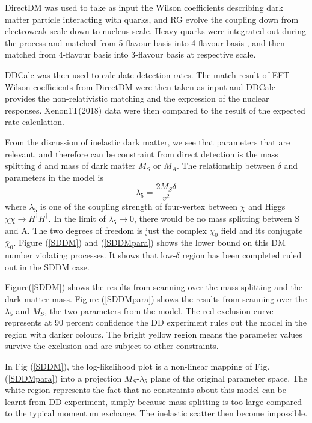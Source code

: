\documentclass[12pt]{article}
\begin{document}
DirectDM was used to take as input the Wilson coefficients describing dark matter particle interacting with quarks, and RG evolve the coupling down from electroweak scale down to nucleus scale. Heavy quarks were integrated out during the process and matched from 5-flavour basis into 4-flavour basis , and then matched from 4-flavour basis into 3-flavour basis at respective scale. 

DDCalc was then used to calculate detection rates. The match result of EFT Wilson coefficients from DirectDM were then taken as input and DDCalc provides the non-relativistic matching and the expression of the nuclear responses. Xenon1T(2018) data were then compared to the result of the expected rate calculation. 


From the discussion of inelastic dark matter, we see that parameters that are relevant, and therefore can be constraint from direct detection is the mass splitting $\delta$ and mass of dark matter $M_S$ or $M_A$. The relationship between $\delta$ and parameters in the model is
$$
\lambda_5 = \frac{2M_S \delta }{v^2}
$$
where $\lambda_5$ is one of the coupling strength of four-vertex between $\chi$ and Higgs $\chi\chi \rightarrow H^\dagger H^\dagger$. In the limit of $\lambda_5 \rightarrow 0$, there would be no mass splitting between S and A. The two degrees of freedom is just the complex $\chi_0$ field and its conjugate $\bar \chi_0$. Figure (\ref{SDDM}) and (\ref{SDDMpara}) shows the lower bound on this DM number violating processes. It shows that low-$\delta$ region has been completed ruled out in the SDDM case. 

Figure(\ref{SDDM}) shows the results from scanning over the mass splitting and the dark matter mass. Figure (\ref{SDDMpara}) shows the results from scanning over the $\lambda_5$ and $M_S$, the two parameters from the model. The red exclusion curve represents at 90 percent confidence the DD experiment rules out the model in the region with darker colours. The bright yellow region means the parameter values survive the exclusion and are subject to other constraints. 

In Fig (\ref{SDDM}), the log-likelihood plot is a non-linear mapping of Fig. (\ref{SDDMpara}) into a projection  $M_S$-$\lambda_5$ plane of the original parameter space. The white region represents the fact that no constraints about this model can be learnt from DD experiment, simply because mass splitting is too large compared to the typical momentum exchange. The inelastic scatter then become impossible. 
\end{document}

